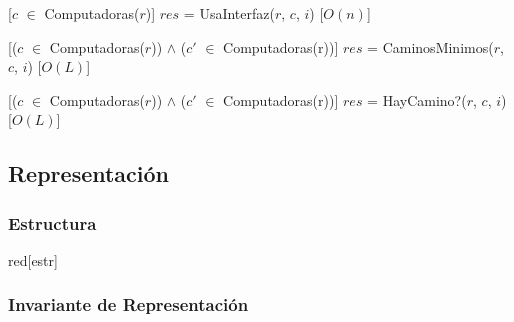   [$c$ $\in$ Computadoras($r$)]
  {$res$ = UsaInterfaz($r$, $c$, $i$)}
  [$O(n)$]

  [($c$ $\in$ Computadoras($r$)) $\land$ ($c'$ $\in$ Computadoras(r))]
  {$res$ = CaminosMinimos($r$, $c$, $i$)}
  [$O(L)$]

  [($c$ $\in$ Computadoras($r$)) $\land$ ($c'$ $\in$ Computadoras(r))]
  {$res$ = HayCamino?($r$, $c$, $i$)}
  [$O(L)$]


\subsection{Representación}

  \subsubsection{Estructura}

    \begin{Estructura}{red}[estr]

      \begin{Tupla}[estr]
      \end{Tupla}

      \begin{Tupla}[nodoRed]
      \end{Tupla}

    \end{Estructura}

\subsubsection{Invariante de Representación}




